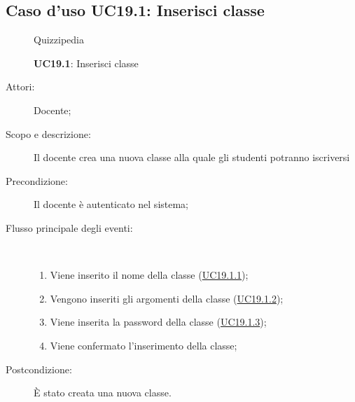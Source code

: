 \subsection{Caso d'uso UC19.1: Inserisci classe}
\begin{figure}[H]
	\centering
	\begin{resizedtikzpicture}{\textwidth}
		\begin{umlsystem}[x=0, fill=lightgray!20]{Quizzipedia}
		\end{umlsystem}
	\end{resizedtikzpicture}
	\caption{\textbf{UC19.1}: Inserisci classe}
	\label{UC19.1}
\end{figure}
\begin{description}
	\item[Attori:] Docente;
	\item[Scopo e descrizione:] Il docente crea una nuova classe alla quale gli studenti potranno iscriversi 
	\item[Precondizione:] Il docente è autenticato nel sistema;
	
	\item[Flusso principale degli eventi:] \ 
	\begin{enumerate}
		\item Viene inserito il nome della classe (\hyperlink{UC19.1.1}{UC19.1.1});
		\item Vengono inseriti gli argomenti della classe (\hyperlink{UC19.1.2}{UC19.1.2});
		\item Viene inserita la password della classe (\hyperlink{UC19.1.3}{UC19.1.3});
		\item Viene confermato l'inserimento della classe;
		
	\end{enumerate}
	\item[Postcondizione:] È stato creata una nuova classe.
\end{description}
\hypertarget{UC19.1.1}{}
